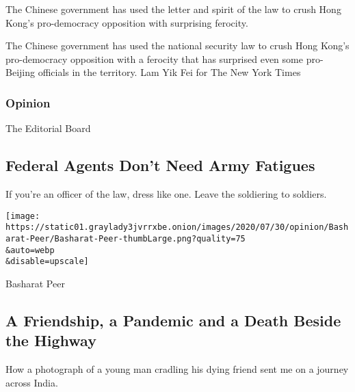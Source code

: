 The Chinese government has used the letter and spirit of the law to
crush Hong Kong's pro-democracy opposition with surprising ferocity.

\href{/2020/07/31/world/asia/hong-kong-election-national-security-law.html}{}

The Chinese government has used the national security law to crush Hong
Kong's pro-democracy opposition with a ferocity that has surprised even
some pro-Beijing officials in the territory. Lam Yik Fei for The New
York Times

\href{https://www.nytimes3xbfgragh.onion/section/opinion?pagetype=Homepage\&action=click\&module=Opinion}{}

\hypertarget{opinion}{%
\subsubsection{Opinion}\label{opinion}}

\href{/2020/07/31/opinion/federal-agents-trump-uniforms.html}{}

The Editorial Board

\hypertarget{federal-agents-dont-need-army-fatigues}{%
\subsection{Federal Agents Don't Need Army
Fatigues}\label{federal-agents-dont-need-army-fatigues}}

If you're an officer of the law, dress like one. Leave the soldiering to
soldiers.

\href{/2020/07/31/opinion/sunday/India-migration-coronavirus.html}{}

\texttt{[image: https://static01.graylady3jvrrxbe.onion/images/2020/07/30/opinion/Basharat-Peer/Basharat-Peer-thumbLarge.png?quality=75\\\&auto=webp\\\&disable=upscale]}

Basharat Peer

\hypertarget{a-friendship-a-pandemic-and-a-death-beside-the-highway}{%
\subsection{A Friendship, a Pandemic and a Death Beside the
Highway}\label{a-friendship-a-pandemic-and-a-death-beside-the-highway}}

How a photograph of a young man cradling his dying friend sent me on a
journey across India.

\href{/2020/07/31/opinion/sunday/India-migration-coronavirus.html}{}

